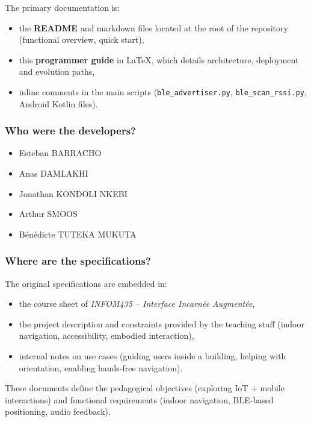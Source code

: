 \documentclass[12pt,a4paper]{article}
\begin{document}
The primary documentation is:

\begin{itemize}
    \item the \textbf{README} and markdown files located at the root of the repository (functional overview, quick start),
    \item this \textbf{programmer guide} in \LaTeX, which details architecture, deployment and evolution paths,
    \item inline comments in the main scripts (\texttt{ble\_advertiser.py}, \texttt{ble\_scan\_rssi.py}, Android Kotlin files).
\end{itemize}

\subsubsection{Who were the developers?}

\begin{itemize}
    \item Esteban BARRACHO
    \item Anas DAMLAKHI
    \item Jonathan KONDOLI NKEBI
    \item Arthur SMOOS
    \item Bénédicte TUTEKA MUKUTA
\end{itemize}

\subsubsection{Where are the specifications?}

The original specifications are embedded in:

\begin{itemize}
    \item the course sheet of \textit{INFOM435 -- Interface Incarnée Augmentée},
    \item the project description and constraints provided by the teaching staff (indoor navigation, accessibility, embodied interaction),
    \item internal notes on use cases (guiding users inside a building, helping with orientation, enabling hands-free navigation).
\end{itemize}

These documents define the pedagogical objectives (exploring IoT + mobile interactions) and functional requirements (indoor navigation, BLE-based positioning, audio feedback).
\end{document}
